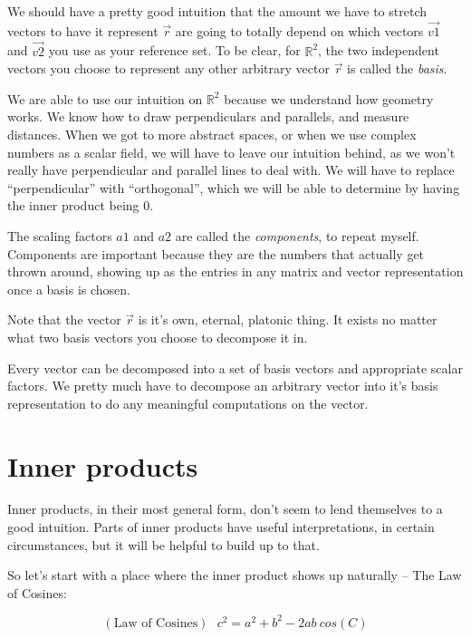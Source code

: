 \documentclass[
]{book}
\begin{document}
We should have a pretty good intuition that the amount we have to stretch vectors to have it represent \(\vec{r}\) are going to totally depend on which vectors \(\vec{v1}\) and \(\vec{v2}\) you use as your reference set. To be clear, for \(\mathbb{R}^2\), the two independent vectors you choose to represent any other arbitrary vector \(\vec{r}\) is called the \emph{basis}.

We are able to use our intuition on \(\mathbb{R}^2\) because we understand how geometry works. We know how to draw perpendiculars and parallels, and measure distances. When we got to more abstract spaces, or when we use complex numbers as a scalar field, we will have to leave our intuition behind, as we won't really have perpendicular and parallel lines to deal with. We will have to replace ``perpendicular'' with ``orthogonal'', which we will be able to determine by having the inner product being 0.

The scaling factors \(a1\) and \(a2\) are called the \emph{components}, to repeat myself. Components are important because they are the numbers that actually get thrown around, showing up as the entries in any matrix and vector representation once a basis is chosen.

Note that the vector \(\vec{r}\) is it's own, eternal, platonic thing. It exists no matter what two basis vectors you choose to decompose it in.

Every vector can be decomposed into a set of basis vectors and appropriate scalar factors. We pretty much have to decompose an arbitrary vector into it's basis representation to do any meaningful computations on the vector.

\hypertarget{inner-products}{%
\section{Inner products}\label{inner-products}}

Inner products, in their most general form, don't seem to lend themselves to a good intuition. Parts of inner products have useful interpretations, in certain circumstances, but it will be helpful to build up to that.

So let's start with a place where the inner product shows up naturally -- The Law of Cosines:

\[(\text{Law of Cosines}) \ \ \  c^2 = a^2 + b^2 - 2 a b \ cos(C)\]
\end{document}
